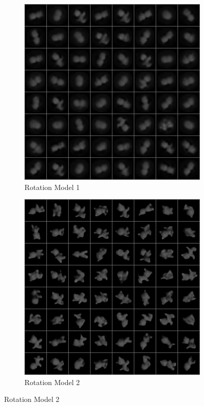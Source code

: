 \documentclass[10pt,a4paper]{article}
\begin{document}
\begin{figure}[!ht]
\begin{subfigure}{0.3\textwidth}
	\includegraphics[width=\textwidth] {cat_4_output0.png}
	\caption{Rotation Model 1}
	\label{cat_rrec}
\end{subfigure}
\begin{subfigure}{0.3\textwidth}
	\centering
	\includegraphics[width=\textwidth] {cat_64_output0.png}
	\caption{Rotation Model 2}
	\label{cat_rrec2}
\end{subfigure}


\end{figure}
\end{document}
